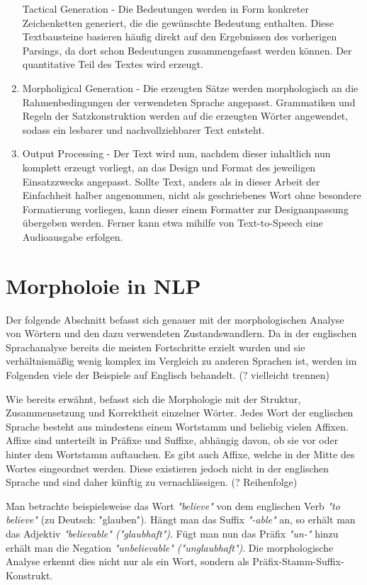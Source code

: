 \documentclass[12pt]{report}
\begin{document}
\begin{enumerate}
Tactical Generation - Die Bedeutungen werden in Form konkreter Zeichenketten generiert, die die gewünschte Bedeutung enthalten. Diese Textbausteine basieren häufig direkt auf den Ergebnissen des vorherigen Parsings, da dort schon Bedeutungen zusammengefasst werden können. Der quantitative Teil des Textes wird erzeugt.
\item
Morpholigical Generation - Die erzeugten Sätze werden morphologisch an die Rahmenbedingungen der verwendeten Sprache angepasst. Grammatiken und Regeln der Satzkonstruktion werden auf die erzeugten Wörter angewendet, sodass ein lesbarer und nachvollziehbarer Text entsteht.
\item
Output Processing - Der Text wird nun, nachdem dieser inhaltlich nun komplett erzeugt vorliegt, an das Design und Format des jeweiligen Einsatzzwecks angepasst. Sollte Text, anders als in dieser Arbeit der Einfachheit halber angenommen, nicht als geschriebenes Wort ohne besondere Formatierung vorliegen, kann dieser einem Formatter zur Designanpassung übergeben werden. Ferner kann etwa mihilfe von Text-to-Speech eine Audioausgabe erfolgen. 
\end{enumerate}

\section{Morpholoie in NLP}
Der folgende Abschnitt befasst sich genauer mit der morphologischen Analyse von Wörtern und den dazu verwendeten Zustandswandlern. Da in der englischen Sprachanalyse bereits die meisten Fortschritte erzielt wurden und sie verhältnismäßig wenig komplex im Vergleich zu anderen Sprachen ist, werden im Folgenden viele der Beispiele auf Englisch behandelt. (? vielleicht trennen)

Wie bereits erwähnt, befasst sich die Morphologie mit der Struktur, Zusammensetzung und Korrektheit einzelner Wörter. Jedes Wort der englischen Sprache besteht aus mindestens einem Wortstamm und beliebig vielen Affixen. Affixe sind unterteilt in Präfixe und Suffixe, abhängig davon, ob sie vor oder hinter dem Wortstamm auftauchen. Es gibt auch Affixe, welche in der Mitte des Wortes eingeordnet werden. Diese existieren jedoch nicht in der englischen Sprache und sind daher künftig zu vernachlässigen. (? Reihenfolge)

Man betrachte beispielsweise das Wort \textit{"believe"} von dem englischen Verb \textit{"to believe"} (zu Deutsch: "glauben"). Hängt man das Suffix \textit{"-able"} an, so erhält man das Adjektiv \textit{"believable" ("glaubhaft")}. Fügt man nun das Präfix \textit{"un-"} hinzu erhält man die Negation \textit{"unbelievable" ("unglaubhaft")}. Die morphologische Analyse erkennt dies nicht nur als ein Wort, sondern als Präfix-Stamm-Suffix-Konstrukt.
\end{document}
